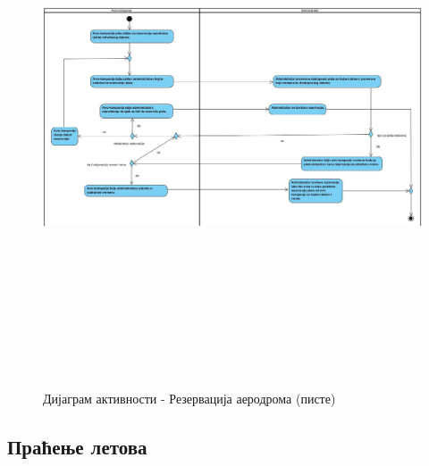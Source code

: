 \documentclass{article}
\begin{document}
\newpage
\begin{figure}[H]
    \centering
    \includegraphics[width=1.1\textwidth, height=16cm]{Dijagrami_slike/rezervacija_aerodroma.jpg}
    \caption{Дијаграм активности - Резервација аеродрома (писте)}
\end{figure}

\newpage
\subsection{Праћење летова}
\end{document}
